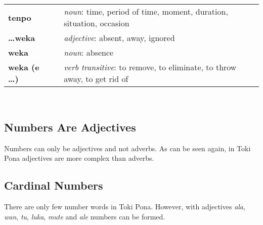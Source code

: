\begin{supertabular}{p{2,5cm}|ll}
    \textbf{tenpo}           &  & \textit{noun}: time, period of time, moment, duration, situation, occasion       \\ %
    \textbf{\dots weka}      &  & \textit{adjective}: absent, away, ignored                                        \\ %
    \textbf{weka}            &  & \textit{noun}: absence                                                           \\ %
    \textbf{weka (e \dots)}  &  & \textit{verb transitive}: to remove, to eliminate, to throw away, to get rid of  \\ %
\end{supertabular} \\
%
%
%
\newpage
%
\subsection*{Numbers Are Adjectives}
%
%
Numbers can only be adjectives and not adverbs.
As can be seen again, in Toki Pona adjectives are more complex than adverbs.
%

\subsection*{Cardinal Numbers}
%
There are only few number words in Toki Pona.
However, with adjectives \textit{ala}, \textit{wan}, \textit{tu}, \textit{luka}, \textit{mute} and \textit{ale} numbers can be formed.

